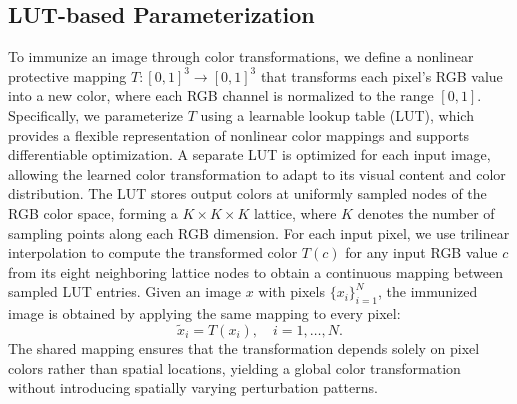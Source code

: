 
\subsection{LUT-based Parameterization}
\label{sec:carrier}
To immunize an image through color transformations, we define a nonlinear protective mapping $T:[0,1]^3\rightarrow[0,1]^3$ that transforms each pixel's RGB value into a new color, where each RGB channel is normalized to the range $[0,1]$. Specifically, we parameterize $T$ using a learnable lookup table (LUT), which provides a flexible representation of nonlinear color mappings and supports differentiable optimization. A separate LUT is optimized for each input image, allowing the learned color transformation to adapt to its visual content and color distribution. The LUT stores output colors at uniformly sampled nodes of the RGB color space, forming a $K\times K\times K$ lattice, where $K$ denotes the number of sampling points along each RGB dimension. For each input pixel, we use trilinear interpolation to compute the transformed color $T(c)$ for any input RGB value $c$ from its eight neighboring lattice nodes to obtain a continuous mapping between sampled LUT entries. Given an image $x$ with pixels $\{x_i\}_{i=1}^{N}$, the immunized image is obtained by applying the same mapping to every pixel:
\begin{equation}
    \tilde{x}_i=T(x_i),\quad i=1,\ldots,N.
\end{equation}
The shared mapping ensures that the transformation depends solely on pixel colors rather than spatial locations, yielding a global color transformation without introducing spatially varying perturbation patterns.

